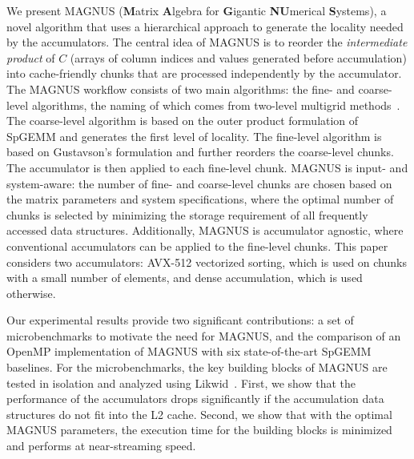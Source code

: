 We present MAGNUS (\textbf{M}atrix \textbf{A}lgebra for \textbf{G}igantic \textbf{NU}merical \textbf{S}ystems), a novel algorithm that uses a hierarchical approach to generate the locality needed by the accumulators.
The central idea of MAGNUS is to reorder the \textit{intermediate product} of $C$ (arrays of column indices and values generated before accumulation) into cache-friendly chunks that are processed independently by the accumulator.
The MAGNUS workflow consists of two main algorithms: the fine- and coarse-level algorithms, the naming of which comes from two-level multigrid methods~\cite{amg1}.
The coarse-level algorithm is based on the outer product formulation of SpGEMM and generates the first level of locality.
The fine-level algorithm is based on Gustavson's formulation and further reorders the coarse-level chunks. The accumulator is then applied to each fine-level chunk.
MAGNUS is input- and system-aware: the number of fine- and coarse-level chunks are chosen based on the matrix parameters and system specifications,
where the optimal number of chunks is selected by minimizing the storage requirement of all frequently accessed data structures.
Additionally, MAGNUS is accumulator agnostic, where conventional accumulators can be applied to the fine-level chunks.
This paper considers two accumulators: AVX-512 vectorized sorting, which is used on chunks with a small number of elements, and dense accumulation, which is used otherwise.

Our experimental results provide two significant contributions: a set of microbenchmarks to motivate the need for MAGNUS, and the comparison of an OpenMP implementation of MAGNUS with six state-of-the-art SpGEMM baselines.
For the microbenchmarks, the key building blocks of MAGNUS are tested in isolation and analyzed using Likwid~\cite{likwid}.
First, we show that the performance of the accumulators drops significantly if the accumulation data structures do not fit into the L2 cache. Second, we show that with the optimal MAGNUS parameters, the execution time for the building blocks is minimized and performs at near-streaming speed.

